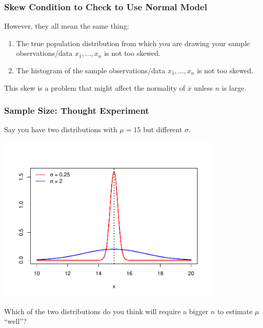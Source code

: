 \documentclass[handout]{beamer}
\newcommand{\blue}[1]{\textcolor{blue2}{#1}}
\newcommand{\xbar}{\overline{x}}
\begin{document}
\begin{frame}
\frametitle{Skew Condition to Check to Use Normal Model}
However, they all mean the same thing:

\begin{enumerate}
\pause\item The \blue{true population} distribution from which you are drawing your sample observations/data $x_1, \ldots, x_n$ is not too skewed.  
\pause\item The histogram of the sample observations/data $x_1, \ldots, x_n$ is not too skewed.  
\end{enumerate}

\vspace{0.25cm}

\pause This skew is a problem that might affect the normality of $\xbar$ \blue{unless $n$ is large}.

\end{frame}






\begin{frame}
\frametitle{Sample Size:  Thought Experiment}
Say you have two distributions with $\mu=15$ but different $\sigma$.
\begin{center}
\includegraphics[width=0.8\textwidth]{figure/norm.pdf}
\end{center}
\pause Which of the two distributions do you think will require a bigger $n$ to estimate $\mu$ ``well''?
\end{frame}
\end{document}
